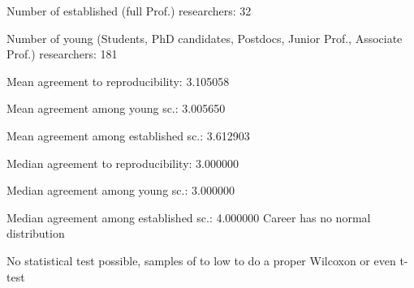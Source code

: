 Number of established (full Prof.) researchers: 32

Number of young (Students, PhD candidates, Postdocs, Junior Prof., Associate Prof.) researchers: 181

Mean agreement to reproducibility: 3.105058

Mean agreement among young sc.: 3.005650

Mean agreement among established sc.: 3.612903

Median agreement to reproducibility: 3.000000

Median agreement among young sc.: 3.000000

Median agreement among established sc.: 4.000000
Career has no normal distribution

No statistical test possible, samples of to low to do a proper Wilcoxon or even t-test
